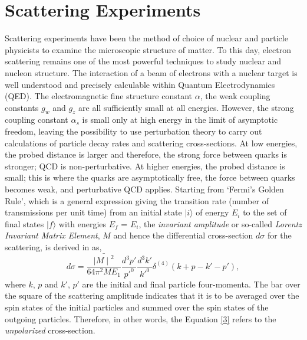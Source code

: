 \section{Scattering Experiments}
\label{sec_scat}
Scattering experiments have been the method of choice of nuclear and particle physicists to examine the microscopic structure of matter.  To this day, electron scattering remains one of the most powerful techniques  to study nuclear and nucleon structure.  The interaction of a beam of electrons with a nuclear target is well understood and precisely calculable within Quantum Electrodynamics (QED). The electromagnetic fine structure constant $\alpha$, the weak coupling constants $g_w$ and $g_z$ are all sufficiently small at all energies. However, the strong coupling constant $\alpha_s$ is small only at high energy in the limit of asymptotic freedom, leaving the possibility to use perturbation theory to carry out calculations of particle decay rates and scattering cross-sections. At low energies, the probed distance is larger and therefore, the strong force between quarks is stronger; QCD is non-perturbative. At higher energies, the probed distance is small; this is where the quarks are asymptotically free, the force between quarks becomes weak, and perturbative QCD applies. Starting from `Fermi's Golden Rule', which is a general expression giving the transition rate (number of transmissions per unit time) from an initial state $\mid i \rangle$ of energy $E_{i}$ to the set of final states $\mid f \rangle$ with energies $E_{f}$ = $E_{i}$, the \emph{invariant amplitude} or so-called \emph{Lorentz Invariant Matrix Element}, $M$ and hence the differential cross-section $d\sigma$ for the scattering, is derived in \cite{5} as,
\begin{equation}
\label{3}
d\sigma = \frac{\bar { {\mid M \mid}^2}}{64 \pi^2ME_1} \frac {d^3p'}{p'^0} \frac {d^3k'}{k'^0} \delta^{(4)}(k+p-k'-p'),
\end{equation}
where $k$, $p$ and $k'$, $p'$ are the initial and final particle four-momenta. The bar over the square of the scattering amplitude indicates that it is to be averaged over the spin states of the initial particles and summed over the spin states of the outgoing particles. Therefore, in other words, the Equation \eqref{3} refers to the \emph{unpolarized} cross-section. 

